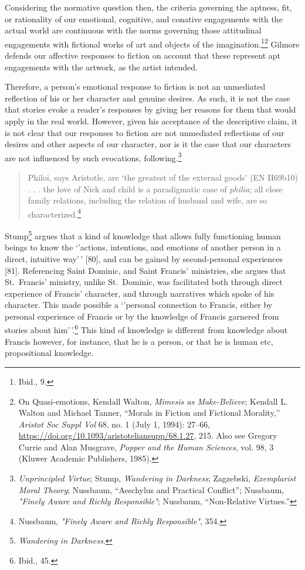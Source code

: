\documentclass[phdthesis,12pt,final]{wuthesis}
\theoremstyle{definition}
\theoremstyle{definition}
\theoremstyle{definition}
\theoremstyle{definition}
\theoremstyle{remark}
\begin{document}
Considering the normative question then, the criteria governing the aptness, fit, or rationality of our emotional, cognitive, and conative engagements with the actual world are continuous with the norms governing those attitudinal engagements with fictional works of art and objects of the imagination.\footnote{Ibid., 9.}\footnote{On Quasi-emotions, Kendall Walton, \emph{Mimesis as {Make-Believe}}; Kendall L. Walton and Michael Tanner, {``Morals in {Fiction} and {Fictional Morality},''} \emph{Aristot Soc Suppl Vol} 68, no. 1 (July 1, 1994): 27--66, \url{https://doi.org/10.1093/aristoteliansupp/68.1.27}, 215. Also see Gregory Currie and Alan Musgrave, \emph{Popper and the Human Sciences}, vol. 98, 3 (Kluwer Academic Publishers, 1985).} Gilmore defends our affective responses to fiction on account that these represent apt engagements with the artwork, as the artist intended.

Therefore, a person's emotional response to fiction is not an unmediated reflection of his or her character and genuine desires. As such, it is not the case that stories evoke a reader's responses by giving her reasons for them that would apply in the real world. However, given his acceptance of the descriptive claim, it is not clear that our responses to fiction are not unmediated reflections of our desires and other aspects of our character, nor is it the case that our characters are not influenced by such evocations, following.\footnote{\emph{Unprincipled {Virtue}}; Stump, \emph{Wandering in {Darkness}}; Zagzebski, \emph{Exemplarist {Moral Theory}}; Nussbaum, {``Aeschylus and Practical Conflict''}; Nussbaum, \emph{"{Finely Aware} and {Richly Responsible}"}; Nussbaum, {``Non-Relative Virtues.''}}

\begin{quote}
Philoi, says Aristotle, are `the greatest of the external goods' (EN II69b10) . . . the love of Nick and child is a paradigmatic case of \emph{philia}; all close family relations, including the relation of husband and wife, are so characterized.\footnote{Nussbaum, \emph{"{Finely Aware} and {Richly Responsible}"}, 354.}
\end{quote}

Stump\footnote{\emph{Wandering in {Darkness}}.} argues that a kind of knowledge that allows fully functioning human beings to know the `'actions, intentions, and emotions of another person in a direct, intuitive way'\,' {[}80{]}, and can be gained by second-personal experiences
{[}81{]}. Referencing Saint Dominic, and Saint Francis' ministries, she argues that St.~Francis' ministry, unlike St.~Dominic, was facilitated both through
direct experience of Francis' character, and through narratives which
spoke of his character. This made possible a `'personal
connection to Francis, either by personal experience of Francis or by
the knowledge of Francis garnered from stories about him'\,'.\footnote{Ibid., 45.} This kind of knowledge is different from knowledge about Francis however, for
instance, that he is a person, or that he is human etc, propositional knowledge.
\end{document}
